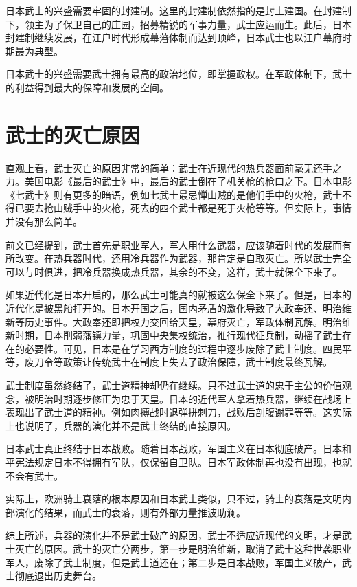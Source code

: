 \documentclass[utf8,a4paper]{ctexart}
\begin{document}
日本武士的兴盛需要牢固的封建制。这里的封建制依然指的是封土建国。在封建制下，领主为了保卫自己的庄园，招募精锐的军事力量，武士应运而生。此后，日本封建制继续发展，在江户时代形成幕藩体制而达到顶峰，日本武士也以江户幕府时期最为典型。

日本武士的兴盛需要武士拥有最高的政治地位，即掌握政权。在军政体制下，武士的利益得到最大的保障和发展的空间。

\section{武士的灭亡原因}
直观上看，武士灭亡的原因非常的简单：武士在近现代的热兵器面前毫无还手之力。美国电影《最后的武士》中，最后的武士倒在了机关枪的枪口之下。日本电影《七武士》则有更多的暗语，例如七武士最忌惮山贼的是他们手中的火枪，武士不得已要去抢山贼手中的火枪，死去的四个武士都是死于火枪等等。但实际上，事情并没有那么简单。

前文已经提到，武士首先是职业军人，军人用什么武器，应该随着时代的发展而有所改变。在热兵器时代，还用冷兵器作为武器，那肯定是自取灭亡。所以武士完全可以与时俱进，把冷兵器换成热兵器，其余的不变，这样，武士就保全下来了。

如果近代化是日本开启的，那么武士可能真的就被这么保全下来了。但是，日本的近代化是被黑船打开的。日本开国之后，国内矛盾的激化导致了大政奉还、明治维新等历史事件。大政奉还即把权力交回给天皇，幕府灭亡，军政体制瓦解。明治维新时期，日本削弱藩镇力量，巩固中央集权统治，推行现代征兵制，动摇了武士存在的必要性。可见，日本是在学习西方制度的过程中逐步废除了武士制度。四民平等，废刀令等政策让传统武士在制度上失去了政治保障，武士制度最终瓦解。

武士制度虽然终结了，武士道精神却仍在继续。只不过武士道的忠于主公的价值观念，被明治时期逐步修正为忠于天皇。日本的近代军人拿着热兵器，继续在战场上表现出了武士道的精神。例如肉搏战时退弹拼刺刀，战败后剖腹谢罪等等。这实际上也说明了，兵器的演化并不是武士终结的直接原因。

日本武士真正终结于日本战败。随着日本战败，军国主义在日本彻底破产。日本和平宪法规定日本不得拥有军队，仅保留自卫队。日本军政体制再也没有出现，也就不会有武士。

实际上，欧洲骑士衰落的根本原因和日本武士类似，只不过，骑士的衰落是文明内部演化的结果，而武士的衰落，则有外部力量推波助澜。

综上所述，兵器的演化并不是武士破产的原因，武士不适应近现代的文明，才是武士灭亡的原因。武士的灭亡分两步，第一步是明治维新，取消了武士这种世袭职业军人，废除了武士制度，但是武士道还在；第二步是日本战败，军国主义破产，武士彻底退出历史舞台。
\end{document}
